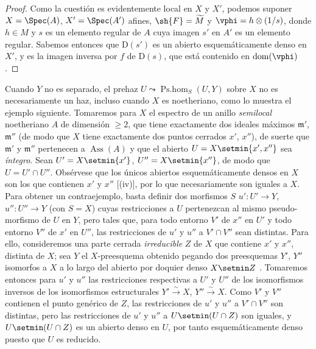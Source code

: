 \begin{proof}
Como la cuestión es evidentemente local en $X$ y $X'$, podemos suponer $X=\Spec(A)$, $X'=\Spec(A')$ afines, $\sh{F}=\widetilde{M}$ y $\vphi=h\otimes(1/s)$, donde $h\in M$ y $s$ es un elemento regular de $A$ cuya imagen $s'$ en $A'$ es un elemento regular.
Sabemos entonces  que $\mathrm{D}(s')$ es un abierto esquemáticamente denso en $X'$, y es la imagen inversa por $f$ de $\mathrm{D}(s)$, que está contenido en $\operatorname{dom}(\vphi)$.
\end{proof}

\begin{remark}[20.2.16]
\label{IV.20.2.16}
Cuando $Y$ no es separado, el prehaz $U\leadsto\operatorname{Ps.hom}_S(U,Y)$ sobre $X$ no es necesariamente un haz, incluso cuando $X$ es noetheriano, como lo muestra el ejemplo siguiente.
  Tomaremos para $X$ el espectro de un anillo \emph{semilocal} noetheriano $A$ de dimensión $\geq2$, que tiene exactamente dos
  ideales máximos $\mathfrak{m}'$, $\mathfrak{m}''$ (de modo que $X$ tiene exactamente dos puntos cerrados $x'$, $x''$), de suerte que $\mathfrak{m}'$ y $\mathfrak{m}''$ pertenecen a $\operatorname{Ass}(A)$ y que el abierto $U=X\setmin\{x',x''\}$ sea \emph{íntegro}.
Sean $U'=X\setmin\{x'\}$, $U''=X\setmin\{x''\}$, de modo que $U=U'\cap U''$.
Obsérvese que los únicos abiertos esquemáticamente densos en $X$ son los que contienen $x'$ y $x''$ [(iv)], por lo que necesariamente son iguales a $X$.
Para obtener un contraejemplo, basta definir dos morfismos $S$ $u':U'\to Y$, $u'':U''\to Y$ (con $S=X$) cuyas restricciones a $U$ pertenezcan al mismo pseudo-morfismo de $U$ en $Y$, pero tales que, para todo entorno $V'$ de $x''$ en $U'$ y todo entorno $V''$ de $x'$ en $U''$, las restricciones de $u'$ y $u''$ a $V'\cap V''$ sean distintas.
Para ello, consideremos una parte cerrada \emph{irreducible} $Z$ de $X$ que contiene $x'$ y $x''$, distinta de $X$; sea $Y$ el $X$-preesquema obtenido pegando dos preesquemas $Y'$, $Y''$ isomorfos a $X$ a lo largo del abierto por doquier denso $X\setmin Z$ .
Tomaremos entonces para $u'$ y $u''$ las restricciones respectivas a $U'$ y $U''$ de los isomorfismos inversos de los isomorfismos estructurales $Y'\xrightarrow{\sim}X$, $Y''\xrightarrow{\sim}X$.
Como $V'$ y $V''$ contienen el punto genérico de $Z$, las restricciones de $u'$ y $u''$ a $V'\cap V''$ son distintas, pero las restricciones de $u'$ y $u''$ a $U\setmin(U\cap Z)$ son iguales, y $U\setmin(U\cap Z)$ es un abierto denso en $U$, por tanto esquemáticamente denso puesto que $U$ es reducido.


\end{remark}
